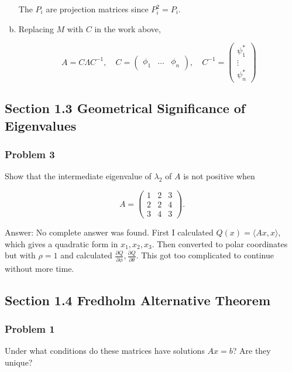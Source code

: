 \documentclass{article}
\begin{document}
\begin{enumerate}[a.]
The $P_i$ are projection matrices since $P_i^2 = P_i$. 

\item

Replacing $M$ with $C$ in the work above,

$$
A = C\Lambda C^{-1}, \quad C = \begin{pmatrix}
\phi_1  & \dots & \phi_n
\end{pmatrix}, \quad C^{-1} = \begin{pmatrix}
\psi_1^* \\ \vdots \\ \psi_n^*
\end{pmatrix}
$$

\end{enumerate}


\newpage
\subsection*{Section 1.3 Geometrical Significance of Eigenvalues}

\subsubsection*{Problem 3}

Show that the intermediate eigenvalue of $\lambda_2$ of $A$ is not positive when

$$
A = \begin{pmatrix}
1 & 2 & 3 \\ 2 & 2 & 4 \\ 3 & 4 & 3
\end{pmatrix}.
$$

Answer: No complete answer was found. First I calculated $Q(x) = \langle Ax , x \rangle$, which gives a quadratic form in $x_1, x_2, x_3$. Then converted to polar coordinates but with $\rho = 1$ and calculated $\frac{\partial{Q}}{\partial \phi}, \frac{\partial{Q}}{\partial \theta}$. This got too complicated to continue without more time.  

\subsection*{Section 1.4 Fredholm Alternative Theorem}

\subsubsection*{Problem 1}

Under what conditions do these matrices have solutions $Ax = b$? Are they unique?
\end{document}
